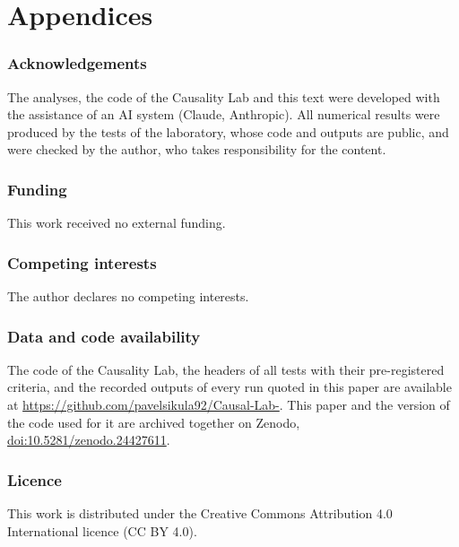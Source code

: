 \documentclass[11pt,a4paper]{article}
\begin{document}
\appendix
\part*{Appendices}



\section*{Acknowledgements}
The analyses, the code of the Causality Lab and this text were developed with the assistance of an AI
system (Claude, Anthropic). All numerical results were produced by the tests of the laboratory, whose
code and outputs are public, and were checked by the author, who takes responsibility for the content.

\section*{Funding}
This work received no external funding.

\section*{Competing interests}
The author declares no competing interests.

\section*{Data and code availability}
The code of the Causality Lab, the headers of all tests with their pre-registered criteria, and the
recorded outputs of every run quoted in this paper are available at
\url{https://github.com/pavelsikula92/Causal-Lab-}. This paper and the version of the code used for it are
archived together on Zenodo, \href{https://doi.org/10.5281/zenodo.24427611}{doi:10.5281/zenodo.24427611}.

\section*{Licence}
This work is distributed under the Creative Commons Attribution 4.0 International licence (CC BY 4.0).



\end{document}
